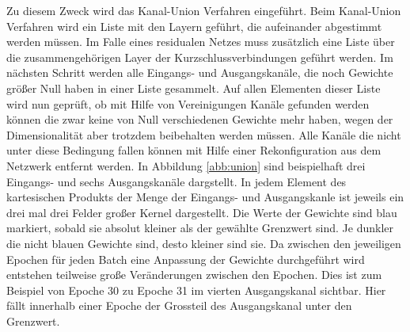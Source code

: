 Zu diesem Zweck wird das Kanal-Union Verfahren eingeführt. Beim Kanal-Union Verfahren wird ein Liste mit den Layern geführt, die aufeinander abgestimmt werden müssen. Im Falle eines residualen Netzes muss zusätzlich eine Liste über die zusammengehörigen Layer der Kurzschlussverbindungen geführt werden. Im nächsten Schritt werden alle Eingangs- und Ausgangskanäle, die noch Gewichte größer Null haben in einer Liste gesammelt. Auf allen Elementen dieser Liste wird nun geprüft, ob mit Hilfe von Vereinigungen Kanäle gefunden werden können die zwar keine von Null verschiedenen Gewichte mehr haben, wegen der Dimensionalität aber trotzdem beibehalten werden müssen. Alle Kanäle die nicht unter diese Bedingung fallen können mit Hilfe einer Rekonfiguration aus dem Netzwerk entfernt werden. In Abbildung \ref{abb:union} sind beispielhaft drei Eingangs- und sechs Ausgangskanäle dargstellt. In jedem Element des kartesischen Produkts der Menge der Eingangs- und Ausgangskanle ist jeweils ein drei mal drei Felder großer Kernel dargestellt. Die Werte der Gewichte sind blau markiert, sobald sie absolut kleiner als der gewählte Grenzwert sind. Je dunkler die nicht blauen Gewichte sind, desto kleiner sind sie. Da zwischen den jeweiligen Epochen für jeden Batch eine Anpassung der Gewichte durchgeführt wird entstehen teilweise große Veränderungen zwischen den Epochen. Dies ist zum Beispiel von Epoche 30 zu Epoche 31 im vierten Ausgangskanal sichtbar. Hier fällt innerhalb einer Epoche der Grossteil des Ausgangskanal unter den Grenzwert.

